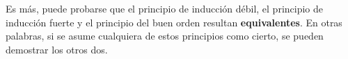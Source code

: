 



\medskip
\medskip

Es más, puede probarse que el principio de inducción débil, el principio de inducción fuerte y el principio del buen orden resultan \textbf{equivalentes}. En otras palabras, si se asume cualquiera de estos principios como cierto, se pueden demostrar los otros dos.

